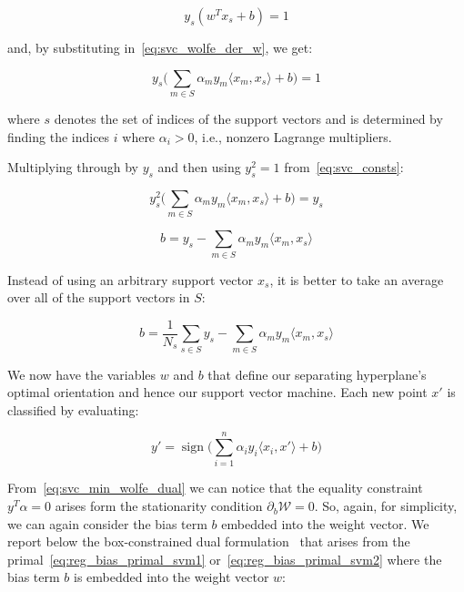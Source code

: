 \begin{equation} \label{eq:svc_sv_const1}
	y_s(w^T x_s + b)=1
\end{equation}

and, by substituting in~\eqref{eq:svc_wolfe_der_w}, we get:

\begin{equation} \label{eq:svc_sv_const2}
	y_s\big(\sum_{m\in S}\alpha_m y_m \langle x_m, x_s \rangle +b\big)=1
\end{equation}

where $s$ denotes the set of indices of the support vectors and is determined by finding the indices $i$ where $\alpha_i>0$, i.e., nonzero Lagrange multipliers.

Multiplying through by $y_s$ and then using $y_s^2=1$ from~\eqref{eq:svc_consts}:

\begin{equation} \label{eq:svc_sv_squared_const2}
	y_s^2\big(\sum_{m\in S}\alpha_m y_m \langle x_m, x_s \rangle +b\big)=y_s
\end{equation}

\begin{equation} \label{eq:svc_b}
	b=y_s-\sum_{m\in S}\alpha_m y_m \langle x_m, x_s \rangle
\end{equation}

Instead of using an arbitrary support vector $x_s$, it is better to take an average over all of the support vectors in $S$:

\begin{equation} \label{eq:svc_b_avg}
	b=\frac{1}{N_s}\sum_{s\in S} y_s-\sum_{m\in S}\alpha_m y_m \langle x_m, x_s \rangle
\end{equation}

We now have the variables $w$ and $b$ that define our separating hyperplane's optimal orientation and hence our support vector machine. Each new point $x'$ is classified by evaluating:

\begin{equation} \label{eq:svc_pred}
    y'=\operatorname{sign}\big(\sum_{i=1}^n\alpha_i y_i\langle x_i, x' \rangle+b\big)
\end{equation}

From~\eqref{eq:svc_min_wolfe_dual} we can notice that the equality constraint $y^T \alpha = 0$ arises form the stationarity condition $\partial_{{b}} \mathcal{W}=0$. So, again, for simplicity, we can again consider the bias term $b$ embedded into the weight vector. We report below the box-constrained dual formulation~\cite{hsu2002simple} that arises from the primal~\eqref{eq:reg_bias_primal_svm1} or~\eqref{eq:reg_bias_primal_svm2} where the bias term $b$ is embedded into the weight vector $w$:

